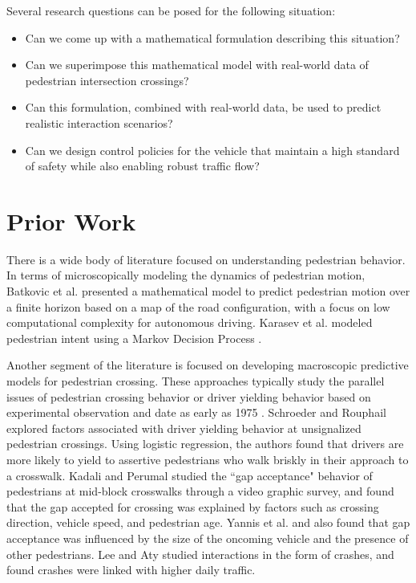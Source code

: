 \documentclass[11pt]{article}
\begin{document}
Several research questions can be posed for the following situation:

\begin{itemize}  
	\item Can we come up with a mathematical formulation describing this situation? 
	\item Can we superimpose this mathematical model with real-world data of pedestrian intersection crossings? 
	\item Can this formulation, combined with real-world data, be used to predict realistic 
	interaction scenarios?
	\item Can we design control policies for the vehicle that maintain a high standard of safety while also enabling robust traffic flow? 
\end{itemize}


\section{Prior Work}

There is a wide body of literature focused on understanding pedestrian behavior. In terms of microscopically modeling the dynamics of pedestrian motion, Batkovic et al. \cite{Batkovic} presented a mathematical model to predict pedestrian motion over a finite horizon based on a map of the road configuration, with a focus on low computational complexity for autonomous driving. Karasev et al. modeled pedestrian intent using a Markov Decision Process \cite{Karasev2016}. 

Another segment of the literature is focused on developing macroscopic predictive models for pedestrian crossing. These approaches typically study the parallel issues of pedestrian crossing behavior or driver yielding behavior based on experimental observation and date as early as 1975 \cite{Katz1975}. Schroeder and Rouphail \cite{Schroeder2011} explored factors associated with driver yielding behavior at unsignalized pedestrian crossings. Using logistic regression, the authors found that drivers are more likely to yield to assertive pedestrians who walk briskly in their approach to a crosswalk. Kadali and Perumal \cite{RaghuramKadali2012} studied the ``gap acceptance" behavior of pedestrians at mid-block crosswalks through a video graphic survey, and found that the gap accepted for crossing was explained by factors such as crossing direction, vehicle speed, and pedestrian age. Yannis et al. \cite{Yannis2013} and \cite{Sun2002} also found that gap acceptance was influenced by the size of the oncoming vehicle and the presence of other pedestrians.  Lee and Aty \cite{Lee2005} studied interactions in the form of crashes, and found crashes were linked with higher daily traffic. 
\end{document}
